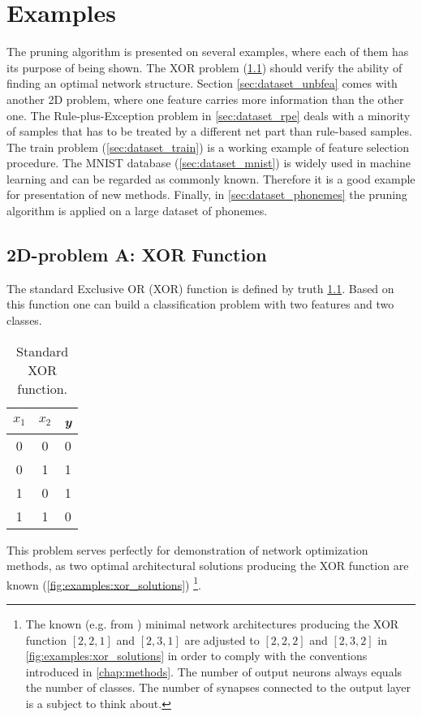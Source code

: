 \chapter{Examples} \label{chap:examples}
The pruning algorithm is presented on several examples, where each of them has its purpose of being shown. The XOR problem (\cref{sec:dataset_xor}) should verify the ability of finding an optimal network structure. Section \ref{sec:dataset_unbfea} comes with another 2D problem, where one feature carries more information than the other one. The Rule-plus-Exception problem in \cref{sec:dataset_rpe} deals with a minority of samples that has to be treated by a different net part than rule-based samples. The train problem (\cref{sec:dataset_train}) is a working example of feature selection procedure. The MNIST database (\cref{sec:dataset_mnist}) is widely used in machine learning and can be regarded as commonly known. Therefore it is a good example for presentation of new methods. Finally, in \cref{sec:dataset_phonemes} the pruning algorithm is applied on a large dataset of phonemes.

\section{2D-problem A: XOR Function} \label{sec:dataset_xor}
The standard Exclusive OR (XOR) function is defined by truth \cref{tab:examples:xor_function}. Based on this function one can build a classification problem with two features and two classes.

\begin{table}[H]
\centering
\begin{tabular}{|c|c||c|}
\hline
\textit{$ x_1 $} & \textit{$ x_2 $} & \textit{y} \\ \hline \hline
0                & 0                & 0          \\ \hline
0                & 1                & 1          \\ \hline
1                & 0                & 1          \\ \hline
1                & 1                & 0          \\ \hline
\end{tabular}
\caption{Standard XOR function.}
\label{tab:examples:xor_function}
\end{table}

This problem serves perfectly for demonstration of network optimization methods, as two optimal architectural solutions producing the XOR function are known (\cref{fig:examples:xor_solutions}) \footnote{The known (e.g. from \citep{online:xor_solution}) minimal network architectures producing the XOR function $ [2, 2, 1] $ and $ [2, 3, 1] $ are adjusted to $ [2, 2, 2] $ and $ [2, 3, 2] $ in \cref{fig:examples:xor_solutions} in order to comply with the conventions introduced in \cref{chap:methods}. The number of output neurons always equals the number of classes. The number of synapses connected to the output layer is a subject to think about.}. 

